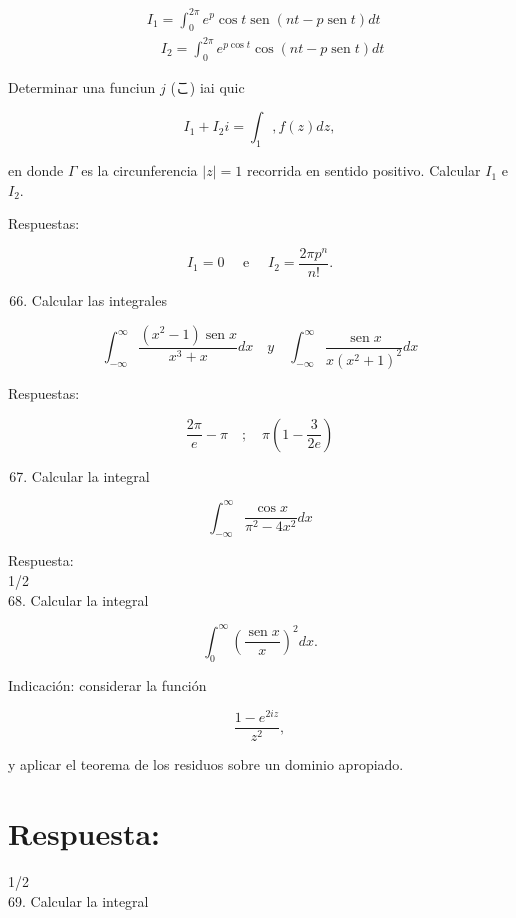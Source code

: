 \documentclass[10pt]{article}
\theoremstyle{plain}
\theoremstyle{definition}
\theoremstyle{remark}
\begin{document}
\begin{align*}
& I_{1}=\int_{0}^{2 \pi} e^{p} \cos t \operatorname{sen}(n t-p \operatorname{sen} t) d t  \tag{y}\\
& \quad I_{2}=\int_{0}^{2 \pi} e^{p \cos t} \cos (n t-p \operatorname{sen} t) d t
\end{align*}


Determinar una funciun $j$ (こ) iai quic

$$
I_{1}+I_{2} i=\int_{1}, f(z) d z,
$$

en donde $\Gamma$ es la circunferencia $|z|=1$ recorrida en sentido positivo. Calcular $I_{1}$ e $I_{2}$.

Respuestas:

$$
I_{1}=0 \quad \text { e } \quad I_{2}=\frac{2 \pi p^{n}}{n!} .
$$

\begin{enumerate}
  \setcounter{enumi}{65}
  \item Calcular las integrales
\end{enumerate}

$$
\int_{-\infty}^{\infty} \frac{\left(x^{2}-1\right) \operatorname{sen} x}{x^{3}+x} d x \quad y \quad \int_{-\infty}^{\infty} \frac{\operatorname{sen} x}{x\left(x^{2}+1\right)^{2}} d x
$$

Respuestas:

$$
\frac{2 \pi}{e}-\pi \quad ; \quad \pi\left(1-\frac{3}{2 e}\right)
$$

\begin{enumerate}
  \setcounter{enumi}{66}
  \item Calcular la integral
\end{enumerate}

$$
\int_{-\infty}^{\infty} \frac{\cos x}{\pi^{2}-4 x^{2}} d x
$$

Respuesta:\\
1/2\\
68. Calcular la integral

$$
\int_{0}^{\infty}\left(\frac{\operatorname{sen} x}{x}\right)^{2} d x .
$$

Indicación: considerar la función

$$
\frac{1-e^{2 i z}}{z^{2}},
$$

y aplicar el teorema de los residuos sobre un dominio apropiado.

\section*{Respuesta:}
1/2\\
69. Calcular la integral
\end{document}
